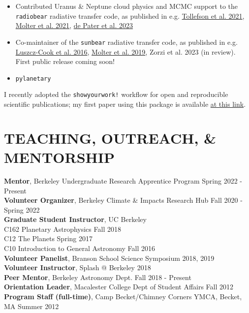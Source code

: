 \documentclass[margin, 10pt]{res} %
\newcommand\tab[1][1cm]{\hspace*{#1}}
\begin{document}
\begin{resume}
\begin{itemize}
\item Contributed Uranus \& Neptune cloud physics and MCMC support to the \texttt{radiobear} radiative transfer code, as published in e.g. \href{https://doi.org/10.3847/PSJ/abf837}{Tollefson et al. 2021}, \href{https://doi.org/10.3847/PSJ/abc48a}{Molter et al. 2021}, \href{https://doi.org/10.3390/rs15051313}{de Pater et al. 2023}

\item Co-maintainer of the \texttt{sunbear} radiative transfer code, as published in e.g. \href{https://doi.org/10.1016/j.icarus.2016.04.032}{Luszcz-Cook et al. 2016}, \href{https://doi.org/10.1016/j.icarus.2018.11.018}{Molter et al. 2019}, Zorzi et al. 2023 (in review). First public release coming soon!

\item \texttt{pylanetary}

\end{itemize}

I recently adopted the \texttt{showyourwork!} workflow for open and reproducible scientific publications; my first paper using this package is available \href{https://github.com/emolter/mab}{at this link}.



\section{TEACHING, OUTREACH, \& MENTORSHIP}

{\bf Mentor}, Berkeley Undergraduate Research Apprentice Program \hfill Spring 2022 - Present \\
{\bf Volunteer Organizer}, Berkeley Climate \& Impacts Research Hub \hfill Fall 2020 - Spring 2022 \\
{\bf Graduate Student Instructor}, UC Berkeley \\
\tab C162 Planetary Astrophysics \hfill Fall 2018 \\
\tab C12 The Planets \hfill  Spring 2017 \\
\tab C10 Introduction to General Astronomy \hfill Fall 2016 \\
{\bf Volunteer Panelist}, Branson School Science Symposium \hfill 2018, 2019 \\
{\bf Volunteer Instructor}, Splash @ Berkeley \hfill 2018 \\
{\bf Peer Mentor}, Berkeley Astronomy Dept.
\hfill Fall 2018 - Present \\
{\bf Orientation Leader}, Macalester College Dept of Student Affairs
\hfill Fall 2012 \\
{\bf Program Staff (full-time)}, Camp Becket/Chimney Corners YMCA,
Becket, MA
\hfill Summer 2012



\end{resume}
\end{document}
